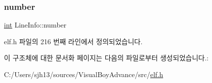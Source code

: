 \mbox{\label{struct_line_info_a5f3cdc8f3a9dceeb63412d3c1e468069}} 
\subsubsection{\texorpdfstring{number}{number}}
{\footnotesize\ttfamily \mbox{\hyperlink{_util_8cpp_a0ef32aa8672df19503a49fab2d0c8071}{int}} Line\+Info\+::number}



elf.\+h 파일의 216 번째 라인에서 정의되었습니다.



이 구조체에 대한 문서화 페이지는 다음의 파일로부터 생성되었습니다.\+:\begin{DoxyCompactItemize}
\item 
C\+:/\+Users/sjh13/sources/\+Visual\+Boy\+Advance/src/\mbox{\hyperlink{elf_8h}{elf.\+h}}\end{DoxyCompactItemize}

